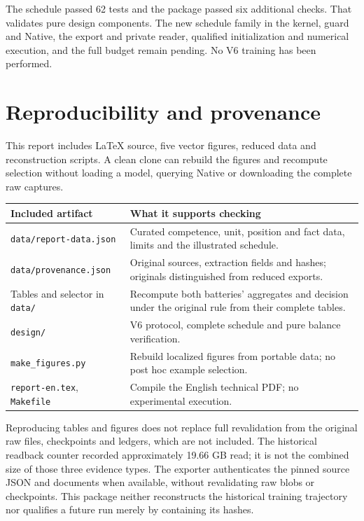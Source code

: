 \documentclass[11pt,a4paper]{article}
\newcommand{\pageend}{\clearpage}
\begin{document}
The schedule passed 62 tests and the package passed six additional checks.
That validates pure design components. The new schedule family in the kernel,
guard and Native, the export and private reader, qualified initialization and
numerical execution, and the full budget remain pending. No V6 training has
been performed.

\pageend
\section{Reproducibility and provenance}
\label{sec:provenance}

This report includes LaTeX source, five vector figures, reduced data and
reconstruction scripts. A clean clone can rebuild the figures and recompute
selection without loading a model, querying Native or downloading the complete
raw captures.

\begin{tabularx}{\linewidth}{@{}>{\raggedright\arraybackslash}p{43mm}Y@{}}
\toprule
\textbf{Included artifact} & \textbf{What it supports checking}\\
\midrule
\texttt{data/report-data.json} & Curated competence, unit, position and fact data, limits and the illustrated schedule.\\
\texttt{data/provenance.json} & Original sources, extraction fields and hashes; originals distinguished from reduced exports.\\
Tables and selector in \texttt{data/} & Recompute both batteries' aggregates and decision under the original rule from their complete tables.\\
\texttt{design/} & V6 protocol, complete schedule and pure balance verification.\\
\texttt{make\_figures.py} & Rebuild localized figures from portable data; no post hoc example selection.\\
\texttt{report-en.tex}, \texttt{Makefile} & Compile the English technical PDF; no experimental execution.\\
\bottomrule
\end{tabularx}

Reproducing tables and figures does not replace full revalidation from the
original raw files, checkpoints and ledgers, which are not included. The
historical readback counter recorded approximately 19.66 GB read; it is not
the combined size of those three evidence types. The exporter authenticates
the pinned source JSON and documents when available, without revalidating raw
blobs or checkpoints. This package neither reconstructs the historical training
trajectory nor qualifies a future run merely by containing its hashes.
\end{document}
